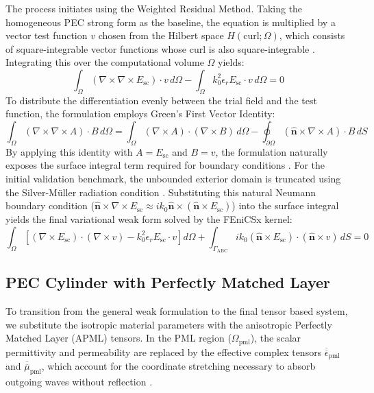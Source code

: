 \vspace{12pt}

The process initiates using the Weighted Residual Method. Taking the homogeneous PEC strong form as the baseline, the equation is multiplied by a vector test function $v$ chosen from the Hilbert space $H(\text{curl}; \Omega)$, which consists of square-integrable vector functions whose curl is also square-integrable \citep{Gatica2011}. Integrating this over the computational volume $\Omega$ yields:
\begin{equation}
\int_{\Omega} (\nabla \times \nabla \times E_{\text{sc}}) \cdot v \, d\Omega - \int_{\Omega} k_0^2 \epsilon_r E_{\text{sc}} \cdot v \, d\Omega = 0
\label{eq:residual_pec}
\end{equation}
To distribute the differentiation evenly between the trial field and the test function, the formulation employs Green's First Vector Identity:
\begin{equation}
\int_{\Omega} (\nabla \times \nabla \times A) \cdot B \, d\Omega = \int_{\Omega} (\nabla \times A) \cdot (\nabla \times B) \, d\Omega - \oint_{\partial \Omega} (\hat{\bm{n}} \times \nabla \times A) \cdot B \, dS
\label{eq:greens_identity}
\end{equation}
By applying this identity with $A = E_{\text{sc}}$ and $B = v$, the formulation naturally exposes the surface integral term required for boundary conditions \citep{Ozgun2007}. For the initial validation benchmark, the unbounded exterior domain is truncated using the Silver-M\"{u}ller radiation condition \citep{Engquist1977}. Substituting this natural Neumann boundary condition ($\hat{\bm{n}} \times \nabla \times E_{\text{sc}} \approx ik_0 \hat{\bm{n}} \times (\hat{\bm{n}} \times E_{\text{sc}})$) into the surface integral yields the final variational weak form solved by the FEniCSx kernel:
\begin{equation}
\int_{\Omega} \left[ (\nabla \times E_{\text{sc}}) \cdot (\nabla \times v) - k_0^2 \epsilon_r E_{\text{sc}} \cdot v \right] d\Omega + \int_{\Gamma_{\text{ABC}}} ik_0 (\hat{\bm{n}} \times E_{\text{sc}}) \cdot (\hat{\bm{n}} \times v) \, dS = 0
\label{eq:weak_form_abc_pec}
\end{equation}

\subsection{PEC Cylinder with Perfectly Matched Layer}

To transition from the general weak formulation to the final tensor based system, we substitute the isotropic material parameters with the anisotropic Perfectly Matched Layer (APML) tensors. In the PML region ($\Omega_{\text{pml}}$), the scalar permittivity and permeability are replaced by the effective complex tensors $\overline{\overline{\epsilon}}_{\text{pml}}$ and $\overline{\overline{\mu}}_{\text{pml}}$, which account for the coordinate stretching necessary to absorb outgoing waves without reflection \citep{Ozgun2007}.

